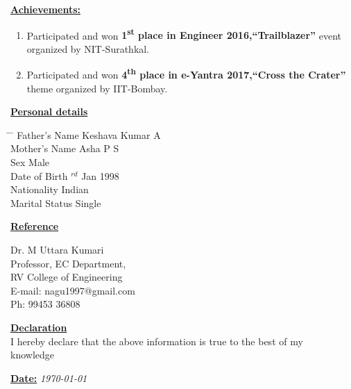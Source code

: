 \documentclass[10pt]{article}
\begin{document}
			\underline{\textbf{\Large{Achievements:}}}
			\begin{enumerate}
				\item{Participated and won \textbf{1\textsuperscript{st}
					place in Engineer 2016,“Trailblazer”} event organized
					by NIT-Surathkal.}
				\item{Participated and won \textbf{4\textsuperscript{th}
					place in e-Yantra 2017,“Cross the Crater”} theme
					organized by IIT-Bombay.}
				
			\end{enumerate}
			
			
			\hfill
			
				\underline{\textbf{\Large{Personal details}}}
				
				\parbox{1.5\textwidth}{ %
					\begin{tabbing} %
						\hspace{3cm} \= \hspace{4cm} \= \kill %
						{ Father's Name} \> Keshava Kumar A\\
						{ Mother's Name} \> Asha P S\\
						{ Sex} \> Male\\
						{ Date of Birth} $^{rd}$ Jan 1998  \\ 
						{ Nationality} \> Indian \\
						{ Marital Status} \> Single
				\end{tabbing}}
				
				\hfill
				
				\underline{\textbf{\Large{Reference}}} 
				\begin{tabbing}
					\hspace{0.5cm}
					Dr. M Uttara Kumari\\
					\hspace{0.5cm}
					Professor, EC Department,\\
					\hspace{0.5cm}
					RV College of Engineering\\
					\hspace{0.5cm}
					{E-mail:}  nagu1997@gmail.com\\
					\hspace{0.5cm}
					Ph: 99453 36808\\
				\end{tabbing}
				
					\underline{\textbf{\Large{Declaration}}} \\
					
					I hereby declare that the above information is true to the best of my \\knowledge
					\\
					\hfill
					
					\underline{\textbf{\large{Date:}}}  {\em\today}
	
\end{document}
